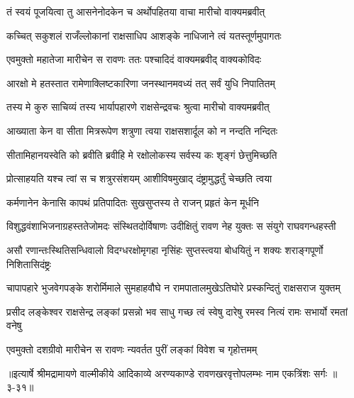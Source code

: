 \twolineshloka
{तं स्वयं पूजयित्वा तु आसनेनोदकेन च}
{अर्थोपहितया वाचा मारीचो वाक्यमब्रवीत्} %

\twolineshloka
{कच्चित् सकुशलं राजँल्लोकानां राक्षसाधिप}
{आशङ्के नाधिजाने त्वं यतस्तूर्णमुपागतः} %

\twolineshloka
{एवमुक्तो महातेजा मारीचेन स रावणः}
{ततः पश्चादिदं वाक्यमब्रवीद् वाक्यकोविदः} %

\twolineshloka
{आरक्षो मे हतस्तात रामेणाक्लिष्टकारिणा}
{जनस्थानमवध्यं तत् सर्वं युधि निपातितम्} %

\twolineshloka
{तस्य मे कुरु साचिव्यं तस्य भार्यापहारणे}
{राक्षसेन्द्रवचः श्रुत्वा मारीचो वाक्यमब्रवीत्} %

\twolineshloka
{आख्याता केन वा सीता मित्ररूपेण शत्रुणा}
{त्वया राक्षसशार्दूल को न नन्दति नन्दितः} %

\twolineshloka
{सीतामिहानयस्वेति को ब्रवीति ब्रवीहि मे}
{रक्षोलोकस्य सर्वस्य कः शृङ्गं छेत्तुमिच्छति} %

\twolineshloka
{प्रोत्साहयति यश्च त्वां स च शत्रुरसंशयम्}
{आशीविषमुखाद् दंष्ट्रामुद्धर्तुं चेच्छति त्वया} %

\twolineshloka
{कर्मणानेन केनासि कापथं प्रतिपादितः}
{सुखसुप्तस्य ते राजन् प्रहृतं केन मूर्धनि} %

\twolineshloka
{विशुद्धवंशाभिजनाग्रहस्ततेजोमदः संस्थितदोर्विषाणः}
{उदीक्षितुं रावण नेह युक्तः स संयुगे राघवगन्धहस्ती} %

\twolineshloka
{असौ रणान्तःस्थितिसन्धिवालो विदग्धरक्षोमृगहा नृसिंहः}
{सुप्तस्त्वया बोधयितुं न शक्यः शराङ्गपूर्णो निशितासिदंष्ट्रः} %

\twolineshloka
{चापापहारे भुजवेगपङ्के शरोर्मिमाले सुमहाहवौघे}
{न रामपातालमुखेऽतिघोरे प्रस्कन्दितुं राक्षसराज युक्तम्} %

\twolineshloka
{प्रसीद लङ्केश्वर राक्षसेन्द्र लङ्कां प्रसन्नो भव साधु गच्छ}
{त्वं स्वेषु दारेषु रमस्व नित्यं रामः सभार्यो रमतां वनेषु} %

\twolineshloka
{एवमुक्तो दशग्रीवो मारीचेन स रावणः}
{न्यवर्तत पुरीं लङ्कां विवेश च गृहोत्तमम्} %


॥इत्यार्षे श्रीमद्रामायणे वाल्मीकीये आदिकाव्ये अरण्यकाण्डे रावणखरवृत्तोपलम्भः नाम एकत्रिंशः सर्गः ॥३-३१॥

